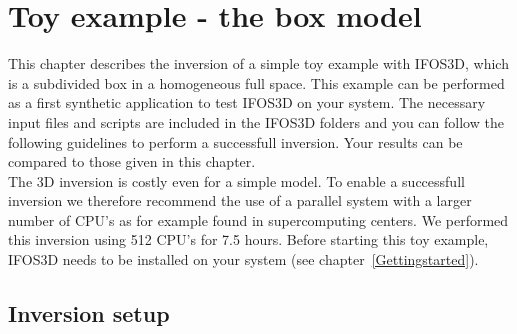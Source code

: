 \chapter{Toy example - the box model}
This chapter describes the inversion of a simple toy example with IFOS3D, which is a subdivided box in a homogeneous full space. This example can be performed as a first synthetic application to test IFOS3D on your system. The necessary input files and scripts are included in the IFOS3D folders and you can follow the following guidelines to perform a successfull inversion.  Your results can be compared to those given in this chapter.\\
The 3D inversion is costly even for a simple model. To enable a successfull inversion we therefore recommend the use of a  parallel system with a larger number of CPU's as for example found in supercomputing centers. We performed this inversion using 512 CPU's for 7.5 hours. Before starting this toy example, IFOS3D needs to be installed on your system (see chapter~\ref{Gettingstarted}).
\section{Inversion setup}

